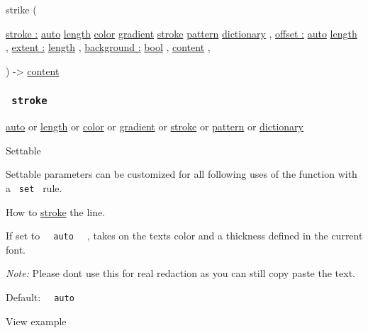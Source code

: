 { strike } (

{ \hyperref[parameters-stroke]{stroke :}
\href{/docs/reference/foundations/auto/}{auto}
\href{/docs/reference/layout/length/}{length}
\href{/docs/reference/visualize/color/}{color}
\href{/docs/reference/visualize/gradient/}{gradient}
\href{/docs/reference/visualize/stroke/}{stroke}
\href{/docs/reference/visualize/pattern/}{pattern}
\href{/docs/reference/foundations/dictionary/}{dictionary} , } {
\hyperref[parameters-offset]{offset :}
\href{/docs/reference/foundations/auto/}{auto}
\href{/docs/reference/layout/length/}{length} , } {
\hyperref[parameters-extent]{extent :}
\href{/docs/reference/layout/length/}{length} , } {
\hyperref[parameters-background]{background :}
\href{/docs/reference/foundations/bool/}{bool} , } {
\href{/docs/reference/foundations/content/}{content} , }

) -\textgreater{} \href{/docs/reference/foundations/content/}{content}

\subsubsection{\texorpdfstring{\texttt{\ stroke\ }}{ stroke }}\label{parameters-stroke}

\href{/docs/reference/foundations/auto/}{auto} {or}
\href{/docs/reference/layout/length/}{length} {or}
\href{/docs/reference/visualize/color/}{color} {or}
\href{/docs/reference/visualize/gradient/}{gradient} {or}
\href{/docs/reference/visualize/stroke/}{stroke} {or}
\href{/docs/reference/visualize/pattern/}{pattern} {or}
\href{/docs/reference/foundations/dictionary/}{dictionary}

{{ Settable }}

\label{parameters-stroke-settable-tooltip}
Settable parameters can be customized for all following uses of the
function with a \texttt{\ set\ } rule.

How to \href{/docs/reference/visualize/stroke/}{stroke} the line.

If set to \texttt{\ }{\texttt{\ auto\ }}\texttt{\ } , takes on the
text\textquotesingle s color and a thickness defined in the current
font.

\emph{Note:} Please don\textquotesingle t use this for real redaction as
you can still copy paste the text.

Default: \texttt{\ }{\texttt{\ auto\ }}\texttt{\ }


View example


